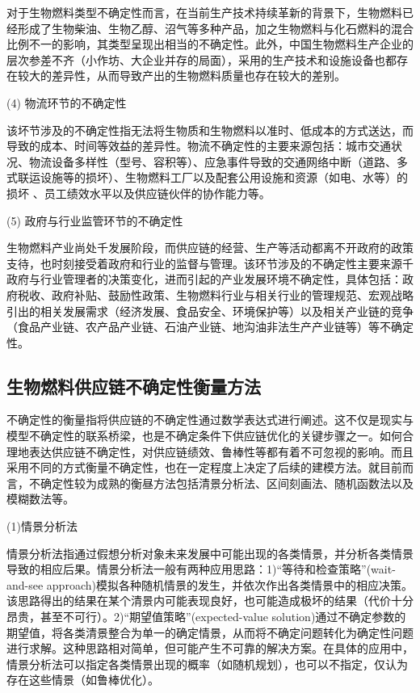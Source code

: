 对于生物燃料类型不确定性而言，在当前生产技术持续革新的背景下，生物燃料已经形成了生物柴油、生物乙醇、沼气等多种产品，加之生物燃料与化石燃料的混合比例不一的影响，其类型呈现出相当的不确定性。此外，中国生物燃料生产企业的层次参差不齐（小作坊、大企业并存的局面），采用的生产技术和设施设备也都存在较大的差异性，从而导致产出的生物燃料质量也存在较大的差别。

(4)	物流环节的不确定性

该坏节涉及的不确定性指无法将生物质和生物燃料以准时、低成本的方式送达，而导致的成本、时间等效益的差异性。物流不确定性的主要来源包括：城市交通状况、物流设备多样性（型号、容积等）、应急事件导致的交通网络中断（道路、多式联运设施等的损坏）、生物燃料工厂以及配套公用设施和资源（如电、水等）的损坏\cite{Langholtz2014} 、员工绩效水平以及供应链伙伴的协作能力\cite{Jiang2014}等。

(5)	政府与行业监管环节的不确定性

生物燃料产业尚处千发展阶段，而供应链的经营、生产等活动都离不开政府的政策支待，也时刻接受着政府和行业的监督与管理。该环节涉及的不确定性主要来源千政府与行业管理者的决策变化，进而引起的产业发展环境不确定性，具体包括：政府税收\cite{Rozakis2005}、政府补贴、鼓励性政策、生物燃料行业与相关行业的管理规范、宏观战略引出的相关发展需求（经济发展、食品安全、环境保护等）以及相关产业链的竞争（食品产业链、农产品产业链、石油产业链、地沟油非法生产产业链等）等不确定性。

\subsection{生物燃料供应链不确定性衡量方法}
不确定性的衡量指将供应链的不确定性通过数学表达式进行阐述。这不仅是现实与模型不确定性的联系桥梁，也是不确定条件下供应链优化的关键步骤之一。如何合理地表达供应链不确定性，对供应链绩效、鲁棒性等都有着不可忽视的影响。而且采用不同的方式衡量不确定性，也在一定程度上决定了后续的建模方法。就目前而言，不确定性较为成熟的衡昼方法包括清景分析法、区间刻画法、随机函数法以及模糊数法等。

(1)情景分析法

情景分析法指通过假想分析对象未来发展中可能出现的各类情景，并分析各类情景导致的相应后果。情景分析法一般有两种应用思路\cite{Chen2012}：1)“等待和检查策略”(wait-and-see approach)模拟各种随机情景的发生，并依次作出各类情景中的相应决策。该思路得出的结果在某个清景内可能表现良好，也可能造成极坏的结果（代价十分昂贵，甚至不可行）。2)“期望值策略”(expected-value solution)通过不确定参数的期望值，将各类清景整合为单一的确定情景，从而将不确定问题转化为确定性问题进行求解。这种思路相对简单，但可能产生不可靠的解决方案。在具体的应用中，情景分析法可以指定各类情景出现的概率（如随机规划），也可以不指定，仅认为存在这些情景（如鲁棒优化）。

